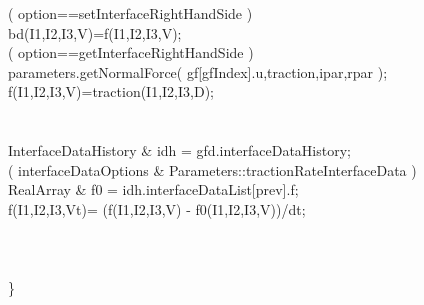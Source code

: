 \begin{flushleft}
\ib     \IF( option==setInterfaceRightHandSide ) \\
\ic       bd(I1,I2,I3,V)=f(I1,I2,I3,V);    \\
\ib     \ELSEIF( option==getInterfaceRightHandSide )  \\
\ic       parameters.getNormalForce( gf[gfIndex].u,traction,ipar,rpar ); \\
\ic       f(I1,I2,I3,V)=traction(I1,I2,I3,D); \\
\ic \\
\ic       {} \\
\ic       InterfaceDataHistory \& idh = gfd.interfaceDataHistory;  \\
\ic       \IF( interfaceDataOptions \& Parameters::tractionRateInterfaceData )\\
\id         RealArray \& f0 = idh.interfaceDataList[prev].f;  \\
\id         f(I1,I2,I3,Vt)= (f(I1,I2,I3,V) - f0(I1,I2,I3,V))/dt;  \\
\ic       \END \\
\ib     \END \\
\ia   \END
\ia   \\
\}
\end{flushleft}

